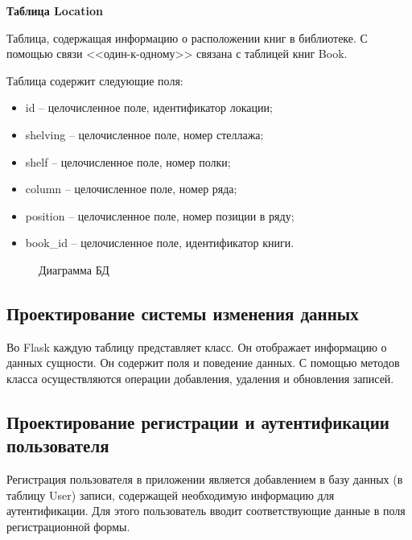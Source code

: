 \documentclass[12pt]{article}
\begin{document}
\hfill \break

{\bf Таблица Location}

Таблица, содержащая информацию о расположении книг в библиотеке. С помощью связи <<один-к-одному>> связана с таблицей книг Book.

Таблица содержит следующие поля:
\begin{itemize}
	\item id – целочисленное поле, идентификатор локации;
	\item shelving – целочисленное поле, номер стеллажа;
	\item shelf – целочисленное поле, номер полки;
	\item column – целочисленное поле, номер ряда;
	\item position – целочисленное поле, номер позиции в ряду;
	\item book\_id – целочисленное поле, идентификатор книги.
\end{itemize}

\begin{figure}[h]
	\caption{Диаграмма БД}
	\label{fig:image}
\end{figure}


\subsection{Проектирование системы изменения данных}%
\setcounter{subsection}{2}

Во Flask каждую таблицу представляет класс. Он отображает информацию о данных сущности. Он содержит поля и поведение данных. 
С помощью методов класса осуществляются операции добавления, удаления и обновления записей.

\subsection{Проектирование регистрации и аутентификации пользователя}%
\setcounter{subsection}{3}

Регистрация пользователя в приложении является добавлением в базу данных (в таблицу User) записи, содержащей необходимую информацию для аутентификации. Для этого пользователь вводит соответствующие данные  в поля регистрационной формы.
\end{document}

